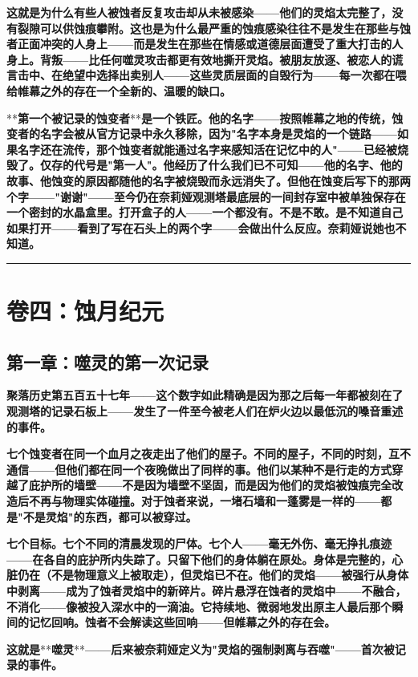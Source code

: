 \documentclass[12pt,a4paper,openany]{ctexbook}
\begin{document}
\textbf{这就是为什么有些人被蚀者反复攻击却从未被感染——他们的灵焰太完整了，没有裂隙可以供蚀痕攀附。这也是为什么最严重的蚀痕感染往往不是发生在那些与蚀者正面冲突的人身上——而是发生在那些在情感或道德层面遭受了重大打击的人身上。背叛——比任何噬灵攻击都更有效地撕开灵焰。被朋友放逐、被恋人的谎言击中、在绝望中选择出卖别人——这些灵质层面的自毁行为——每一次都在喂给帷幕之外的存在一个全新的、温暖的缺口。}


**\textbf{第一个被记录的蚀变者}**\textbf{是一个铁匠。他的名字——按照帷幕之地的传统，蚀变者的名字会被从官方记录中永久移除，因为"名字本身是灵焰的一个链路——如果名字还在流传，那个蚀变者就能通过名字来感知活在记忆中的人"——已经被烧毁了。仅存的代号是"第一人"。他经历了什么我们已不可知——他的名字、他的故事、他蚀变的原因都随他的名字被烧毁而永远消失了。但他在蚀变后写下的那两个字——"谢谢"——至今仍在奈莉娅观测塔最底层的一间封存室中被单独保存在一个密封的水晶盒里。打开盒子的人——一个都没有。不是不敢。是不知道自己如果打开——看到了写在石头上的两个字——会做出什么反应。奈莉娅说她也不知道。}


\bigskip\hrule\bigskip


\chapter{卷四：蚀月纪元}


\section*{第一章：噬灵的第一次记录}


\textbf{聚落历史第五百五十七年——这个数字如此精确是因为那之后每一年都被刻在了观测塔的记录石板上——发生了一件至今被老人们在炉火边以最低沉的嗓音重述的事件。}


\textbf{七个蚀变者在同一个血月之夜走出了他们的屋子。不同的屋子，不同的时刻，互不通信——但他们都在同一个夜晚做出了同样的事。他们以某种不是行走的方式穿越了庇护所的墙壁——不是因为墙壁不坚固，而是因为他们的灵焰被蚀痕完全改造后不再与物理实体碰撞。对于蚀者来说，一堵石墙和一蓬雾是一样的——都是"不是灵焰"的东西，都可以被穿过。}


\textbf{七个目标。七个不同的清晨发现的尸体。七个人——毫无外伤、毫无挣扎痕迹——在各自的庇护所内失踪了。只留下他们的身体躺在原处。身体是完整的，心脏仍在（不是物理意义上被取走），但灵焰已不在。他们的灵焰——被强行从身体中剥离——成为了蚀者灵焰中的新碎片。碎片悬浮在蚀者的灵焰中——不融合，不消化——像被投入深水中的一滴油。它持续地、微弱地发出原主人最后那个瞬间的记忆回响。蚀者不会解读这些回响——但帷幕之外的存在会。}


\textbf{这就是}**\textbf{噬灵}**\textbf{——后来被奈莉娅定义为"灵焰的强制剥离与吞噬"——首次被记录的事件。}
\end{document}
